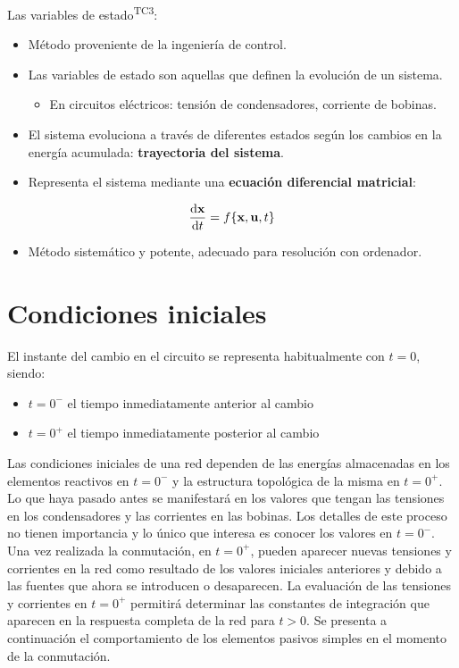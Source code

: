 Las variables de estado\textsuperscript{TC3}:

\begin{itemize}
\item Método proveniente de la ingeniería de control.
\item Las variables de estado son aquellas que definen la evolución de un sistema.
\begin{itemize}
\item En circuitos eléctricos: tensión de condensadores, corriente de bobinas.
\end{itemize}
\item El sistema evoluciona a través de diferentes estados según los cambios en la energía acumulada: \textbf{trayectoria del sistema}.
\item Representa el sistema mediante una \textbf{ecuación diferencial matricial}:
\end{itemize}
\[
  \diff{\mathbf{x}}{t} = f\{\mathbf{x}, \mathbf{u}, t\}
  \]
\begin{itemize}
\item Método sistemático y potente, adecuado para resolución con ordenador.
\end{itemize}

\section{Condiciones iniciales}\label{sec:condiciones_iniciales}
	
El instante del cambio en el circuito se representa habitualmente con
$t = 0$, siendo:
\begin{itemize}
\item $t = 0^-$ el tiempo inmediatamente anterior al cambio
\item $t = 0^+$ el tiempo inmediatamente posterior al cambio
\end{itemize}
Las condiciones iniciales de una red dependen de las energías
almacenadas en los elementos reactivos en $t=0^-$ y la estructura
topológica de la misma en $t=0^+$. Lo que haya pasado antes se
manifestará en los valores que tengan las tensiones en los
condensadores y las corrientes en las bobinas. Los detalles de este
proceso no tienen importancia y lo único que interesa es conocer los
valores en $t=0^-$. Una vez realizada la conmutación, en $t=0^+$,
pueden aparecer nuevas tensiones y corrientes en la red como resultado
de los valores iniciales anteriores y debido a las fuentes que ahora
se introducen o desaparecen. La evaluación de las tensiones y
corrientes en $t=0^+$ permitirá determinar las constantes de
integración que aparecen en la respuesta completa de la red para
$t>0$. Se presenta a continuación el comportamiento de los elementos
pasivos simples en el momento de la conmutación.
	
